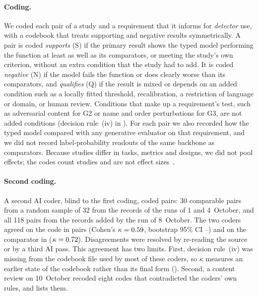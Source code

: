 \paragraph{Coding.}
We coded each pair of a study and a requirement that it informs for \emph{detector} use, with a codebook that treats supporting and negative results symmetrically.
A pair is coded \emph{supports} (S) if the primary result shows the typed model performing the function at least as well as its comparators, or meeting the study's own criterion, without an extra condition that the study had to add.
It is coded \emph{negative} (N) if the model fails the function or does clearly worse than its comparators, and \emph{qualifies} (Q) if the result is mixed or depends on an added condition such as a locally fitted threshold, recalibration, a restriction of language or domain, or human review.
Conditions that make up a requirement's test, such as adversarial content for G2 or name and order perturbations for G3, are not added conditions (decision rule~(iv) in ).
For each pair we also recorded how the typed model compared with any generative evaluator on that requirement, and we did not record label-probability readouts of the same backbone as comparators.
Because studies differ in tasks, metrics and designs, we did not pool effects; the codes count studies and are not effect sizes~\cite{campbell2020swim}.

\paragraph{Second coding.}
A second AI coder, blind to the first coding, coded \nKappaNAll{} pairs: 30 comparable pairs from a random sample of 32 from the records of the runs of 1 and 4~October, and all 118 pairs from the records added by the run of 8~October.
The two coders agreed on the code in \nKappaAgreeAll{} pairs (Cohen's $\kappa = 0.59{}$, bootstrap 95\% CI \nKappaAllLo{}--\nKappaAllHi{}) and on the comparator in \nCompKappaAgree{} ($\kappa = 0.72{}$). Disagreements were resolved by re-reading the source or by a third AI pass.
This agreement has two limits.
First, decision rule~(iv) was missing from the codebook file used by most of these coders, so $\kappa$ measures an earlier state of the codebook rather than its final form ().
Second, a content review on 10~October recoded eight codes that contradicted the coders' own rules, and  lists them.


